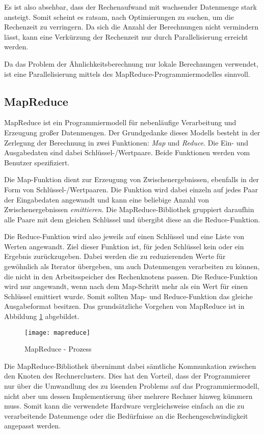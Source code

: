 Es ist also absehbar, dass der Rechenaufwand mit wachsender Datenmenge stark ansteigt. Somit scheint es ratsam, nach Optimierungen zu suchen, um die Rechenzeit zu verringern. Da sich die Anzahl der Berechnungen nicht vermindern lässt, kann eine Verkürzung der Rechenzeit nur durch Parallelisierung erreicht werden.

Da das Problem der Ähnlichkeitsberechnung nur lokale Berechnungen verwendet, ist eine Parallelisierung mittels des MapReduce-Programmiermodelles sinnvoll.

\subsection{MapReduce}
\label{mapreduce}

MapReduce \cite{dg2004} ist ein Programmiermodell für nebenläufige Verarbeitung und Erzeugung großer Datenmengen. Der Grundgedanke dieses Modells besteht in der Zerlegung der Berechnung in zwei Funktionen: \emph{Map} und \emph{Reduce}. Die Ein- und Ausgabedaten sind dabei Schlüssel-/Wertpaare. Beide Funktionen werden vom Benutzer spezifiziert.

Die Map-Funktion dient zur Erzeugung von Zwischenergebnissen, ebenfalls in der Form von Schlüssel-/Wertpaaren. Die Funktion wird dabei einzeln auf jedes Paar der Eingabedaten angewandt und kann eine beliebige Anzahl von Zwischenergebnissen \emph{emittieren}. Die MapReduce-Bibliothek gruppiert daraufhin alle Paare mit dem gleichen Schlüssel und übergibt diese an die Reduce-Funktion.

Die Reduce-Funktion wird also jeweils auf einen Schlüssel und eine Liste von Werten angewandt. Ziel dieser Funktion ist, für jeden Schlüssel kein oder ein Ergebnis zurückzugeben. Dabei werden die zu reduzierenden Werte für gewöhnlich als Iterator übergeben, um auch Datenmengen verarbeiten zu können, die nicht in den Arbeitsspeicher des Rechenknotens passen. Die Reduce-Funktion wird nur angewandt, wenn nach dem Map-Schritt mehr als ein Wert für einen Schlüssel emittiert wurde. Somit sollten Map- und Reduce-Funktion das gleiche Ausgabeformat besitzen. Das grundsätzliche Vorgehen von MapReduce ist in Abbildung \ref{fig:mapreduce} abgebildet.

\begin{figure}
\centering
\texttt{[image: mapreduce]}
\caption{MapReduce - Prozess}
\label{fig:mapreduce}
\end{figure}

Die MapReduce-Bibliothek übernimmt dabei sämtliche Kommunkation zwischen den Knoten des Rechnerclusters. Dies hat den Vorteil, dass der Programmierer nur über die Umwandlung des zu lösenden Problems auf das Programmiermodell, nicht aber um dessen Implementierung über mehrere Rechner hinweg kümmern muss. Somit kann die verwendete Hardware vergleichsweise einfach an die zu verarbeitende Datenmenge oder die Bedürfnisse an die Rechengeschwindigkeit angepasst werden.

